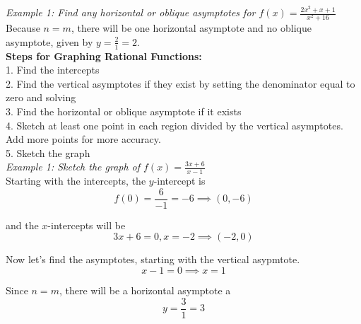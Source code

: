 \documentclass{article}
\begin{document}
    \noindent \color{blue} \textit{Example 1: Find any horizontal or oblique asymptotes for
    $f(x)=\frac{2x^2+x+1}{x^2+16}$} \color{black} \\
    Because $n=m$, there will be one horizontal asymptote and no oblique asymptote, given by
    $y=\frac{2}{1}=2$. \\

    \noindent \color{purple} \textbf{Steps for Graphing Rational Functions:} \color{black} \\
    1. Find the intercepts \\
    2. Find the vertical asymptotes if they exist by setting the denominator equal to zero and solving \\
    3. Find the horizontal or oblique asymptote if it exists \\
    4. Sketch at least one point in each region divided by the vertical asymptotes.
    Add more points for more accuracy. \\
    5. Sketch the graph \\

    \noindent \color{blue} \textit{Example 1: Sketch the graph of $f(x)=\frac{3x+6}{x-1}$}
    \color{black} \\
    Starting with the intercepts, the $y$-intercept is \\

    \begin{equation*}
        f(0)=\frac{6}{-1}=-6\implies (0, -6)
    \end{equation*}

    \noindent and the $x$-intercepts will be \\

    \begin{equation*}
        3x+6=0, x=-2\implies (-2,0)
    \end{equation*}

    \noindent Now let's find the asymptotes, starting with the vertical asypmtote. \\

    \begin{equation*}
        x-1=0\implies x=1
    \end{equation*}

    \noindent Since $n=m$, there will be a horizontal asymptote a \\

    \begin{equation*}
        y=\frac{3}{1}=3
    \end{equation*}
\end{document}
